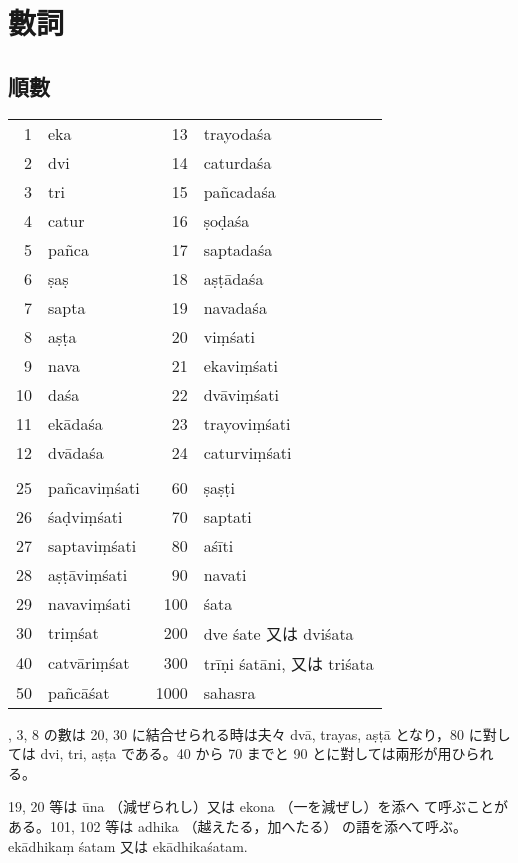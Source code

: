 \section{數詞}
\subsection{順數}
\numberParagraph
\begin{longtable}{rlrl}
 1 & eka     & 13 & trayodaśa \\
 2 & dvi     & 14 & caturdaśa \\
 3 & tri     & 15 & pañcadaśa \\
 4 & catur   & 16 & ṣoḍaśa \\
 5 & pañca   & 17 & saptadaśa \\
 6 & ṣaṣ     & 18 & aṣṭādaśa \\
 7 & sapta   & 19 & navadaśa\footnotemark \\
 8 & aṣṭa    & 20 & viṃśati \\
 9 & nava    & 21 & ekaviṃśati \\
10 & daśa    & 22 & dvāviṃśati \\
11 & ekādaśa & 23 & trayoviṃśati \\
12 & dvādaśa & 24 & caturviṃśati \\
\\
25 & pañcaviṃśati              &   60 & ṣaṣṭi \\
26 & śaḍviṃśati                &   70 & saptati \\
27 & saptaviṃśati              &   80 & aśīti \\
28 & aṣṭāviṃśati               &   90 & navati \\
29 & navaviṃśati\footnotemark  &  100 & śata \\
30 & triṃśat                   &  200 & dve śate 又は dviśata\\
40 & catvāriṃśat               &  300 & trīṇi śatāni, 又は triśata \\
50 & pañcāśat                  & 1000 & sahasra \\
\end{longtable}

, 3, 8 の數は 20, 30 に結合せられる時は夫々 dvā,
trayas, aṣṭā となり，80 に對しては dvi, tri, aṣṭa である。40
から 70 までと 90 とに對しては兩形が用ひられる。

19, 20 等は ūna （減ぜられし）又は ekona （一を減ぜし）を添へ
て呼ぶことがある。101, 102 等は adhika （越えたる，加へたる）
の語を添へて呼ぶ。ekādhikaṃ śatam 又は ekādhikaśatam.

